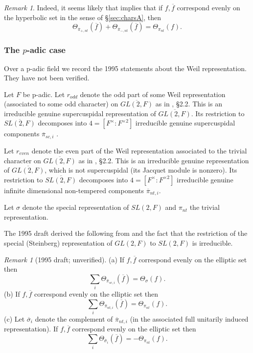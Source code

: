 \documentclass[12pt,letterpaper,openany]{book}
\theoremstyle{plain}
\theoremstyle{definition}
\theoremstyle{remark}
\newtheorem{remark}[theorem]{Remark}
\theoremstyle{remark}
\newtheorem{remyy}{Remark}
\begin{document}
\begin{remark}
Indeed, it seems likely that \cite{Fl} implies that
if $f,\overline{f}$ correspond evenly on the hyperbolic set in
the sense of \S\ref{sec:charsA}, then
\[
\Theta_{\overline{\pi}_{+,nt}}(\overline{f})
+\Theta_{\overline{\pi}_{-,nt}}(\overline{f})
=\Theta_{\pi_{nt}}(f).
\]
\end{remark}

\subsubsection{The \texorpdfstring{$p$}{p}-adic case}

Over a p-adic field we record the 1995 statements about the Weil representation. They have not been verified.


Let $F$ be p-adic. Let $r_{odd}$ denote the odd part of some Weil
representation (associated to some odd character)
on $\overline{GL(2,F)}$ as in \cite{Fl}, \S 2.2. This is an
irreducible genuine supercuspidal representation of
$\overline{GL(2,F)}$. Its restriction to
$\overline{SL(2,F)}$ decomposes into $4=[F^\times:F^{\times 2}]$
irreducible genuine supercuspidal components $\overline{\pi}_{sc,i}$
\cite{M3}.

Let $r_{even}$ denote the even part of the Weil
representation associated to the trivial character on
$\overline{GL(2,F)}$ as in \cite{Fl}, \S 2.2. This is an
irreducible genuine representation of
$\overline{GL(2,F)}$, which is not supercuspidal (its Jacquet module is
nonzero). Its restriction to
$\overline{SL(2,F)}$ decomposes into $4=[F^\times:F^{\times 2}]$
irreducible genuine infinite dimensional
non-tempered components $\overline{\pi}_{nt,i}$.

Let $\sigma$ denote the special representation of $SL(2,F)$
and $\pi_{nt}$ the trivial representation.

The 1995 draft derived the following from \cite{Fl} and the fact that the
restriction of the special (Steinberg) representation of $GL(2,F)$
to $SL(2,F)$ is irreducible.

\begin{remyy}[1995 draft; unverified] (a) If $f, \overline{f}$ correspond evenly on the elliptic set
then
\[
\sum_i \Theta_{\overline{\pi}_{sc,i}}(\overline{f})
=\Theta_\sigma(f).
\]
(b) If $f,\overline{f}$ correspond evenly on the elliptic set
then
\[
\sum_i \Theta_{\overline{\pi}_{nt,i}}(\overline{f})
=\Theta_{\pi_{nt}}(f).
\]
(c) Let $\overline{\sigma}_i$ denote the complement of
$\overline{\pi}_{nt,i}$ (in the associated full unitarily
induced representation). If $f,\overline{f}$ correspond
evenly on the elliptic set then
\[
\sum_i \Theta_{\overline{\sigma}_{i}}(\overline{f})
=-\Theta_{\pi_{nt}}(f).
\]
\end{remyy}
\end{document}
